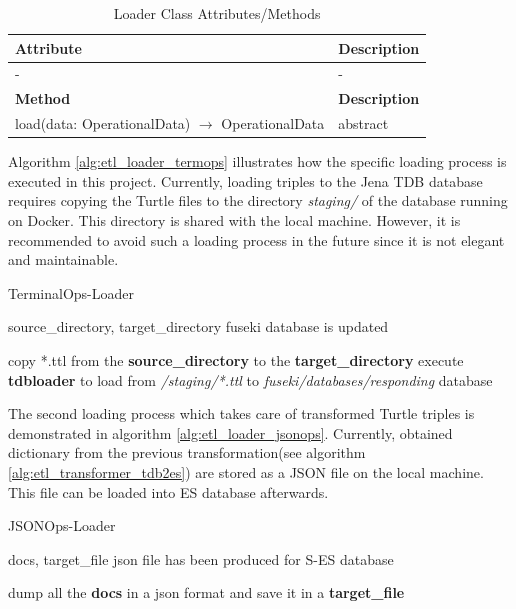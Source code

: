 \begin{table}[H]
	\centering
	\begin{tabular}{|p{}|p{}|}
		\hline
		\textbf{Attribute} & \textbf{Description} \\ 
		\hline
		- & - \\
		\hline
		\hline
		\textbf{Method} & \textbf{Description} \\ 
		\hline
		load(data: OperationalData) $\rightarrow$ OperationalData & abstract \\
		\hline
	\end{tabular}
	\caption{Loader Class Attributes/Methods}
	\label{tab:class_attr_loader}
\end{table}

Algorithm \ref{alg:etl_loader_termops} illustrates how the specific loading process is executed 
in this project. Currently, loading triples to the Jena TDB database requires copying the Turtle 
files to the directory \textit{staging/} of the database running on Docker. This directory is shared 
with the local machine. However, it is recommended to avoid such a loading process in the future since 
it is not elegant and maintainable.

\begin{algorithm}
\caption{TerminalOps-Loader}\label{alg:etl_loader_termops}
\begin{algorithmic}
\Require source\_directory, target\_directory
\Ensure fuseki database is updated

\State copy *.ttl from the \textbf{source\_directory} to the \textbf{target\_directory}	
\State execute \textbf{tdbloader} to load from \textit{/staging/*.ttl} to \textit{fuseki/databases/responding} database
\end{algorithmic}
\end{algorithm}

The second loading process which takes care of transformed Turtle triples is demonstrated in 
algorithm \ref{alg:etl_loader_jsonops}. Currently, obtained dictionary from the previous 
transformation(see algorithm \ref{alg:etl_transformer_tdb2es}) are stored as a JSON file on the 
local machine. This file can be loaded into ES database afterwards.

\begin{algorithm}
\caption{JSONOps-Loader}\label{alg:etl_loader_jsonops}
\begin{algorithmic}
\Require docs, target\_file
\Ensure json file has been produced for S-ES database

\State dump all the \textbf{docs} in a json format and save it in a \textbf{target\_file}
\end{algorithmic}
\end{algorithm}

